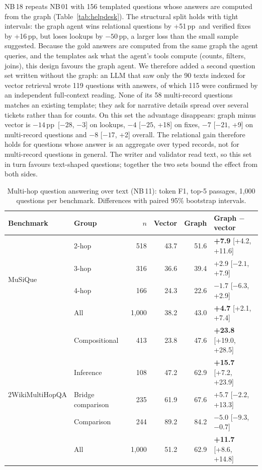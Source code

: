 \documentclass[11pt,a4paper]{article}
\newcommand{\pp}{\,pp}
\newcommand{\nb}[1]{NB\,#1}
\begin{document}
\nb{18} repeats \nb{01} with 156 templated questions whose answers are computed from the graph
(Table~\ref{tab:helpdesk}). The structural split holds with tight intervals: the graph agent wins relational
questions by +51\pp\ and verified fixes by +16\pp, but loses lookups by $-50$\pp, a larger loss than the small
sample suggested. Because the gold answers are computed from the same graph the agent queries, and the templates
ask what the agent's tools compute (counts, filters, joins), this design favours the graph agent.
We therefore added a second question set written without the graph: an LLM that saw only the 90 texts indexed
for vector retrieval wrote 119 questions with answers, of which 115 were confirmed by an independent full-context
reading. None of its 58 multi-record questions matches an existing template; they ask for narrative details
spread over several tickets rather than for counts. On this set the advantage disappears: graph minus vector is
$-14$\pp\ [$-28$, $-3$] on lookups, $-4$ [$-25$, +18] on fixes, $-7$ [$-21$, +9] on multi-record questions and
$-8$ [$-17$, +2] overall. The relational gain therefore holds for questions whose answer is an aggregate over typed
records, not for multi-record questions in general. The writer and validator read text, so this set in turn favours
text-shaped questions; together the two sets bound the effect from both sides.

\begin{table}[t]
\centering
\small
\caption{Multi-hop question answering over text (\nb{11}): token F1, top-5 passages, 1{,}000 questions per
benchmark. Differences with paired 95\% bootstrap intervals.}
\label{tab:multihop}
\begin{tabular}{@{}llrrrl@{}}
\toprule
Benchmark & Group & $n$ & Vector & Graph & Graph $-$ vector \\
\midrule
\multirow{4}{*}{MuSiQue}
 & 2-hop & 518 & 43.7 & 51.6 & \textbf{+7.9} [+4.2, +11.6] \\
 & 3-hop & 316 & 36.6 & 39.4 & +2.9 [$-2.1$, +7.9] \\
 & 4-hop & 166 & 24.3 & 22.6 & $-1.7$ [$-6.3$, +2.9] \\
 & All & 1{,}000 & 38.2 & 43.0 & \textbf{+4.7} [+2.1, +7.4] \\
\midrule
\multirow{5}{*}{2WikiMultiHopQA}
 & Compositional & 413 & 23.8 & 47.6 & \textbf{+23.8} [+19.0, +28.5] \\
 & Inference & 108 & 47.2 & 62.9 & \textbf{+15.7} [+7.2, +23.9] \\
 & Bridge comparison & 235 & 61.9 & 67.6 & +5.7 [$-2.2$, +13.3] \\
 & Comparison & 244 & 89.2 & 84.2 & $\mathbf{-5.0}$ [$-9.3$, $-0.7$] \\
 & All & 1{,}000 & 51.2 & 62.9 & \textbf{+11.7} [+8.6, +14.8] \\
\bottomrule
\end{tabular}
\end{table}
\end{document}
